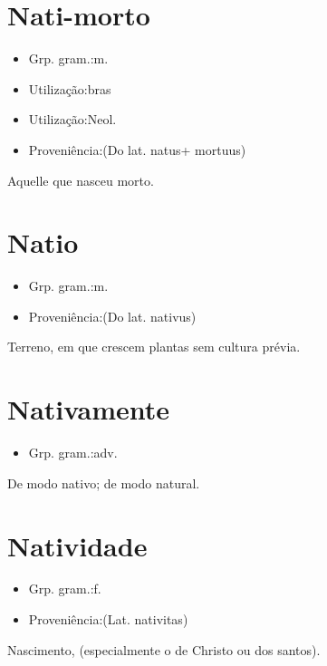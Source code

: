 \section{Nati-morto}
\begin{itemize}
\item {Grp. gram.:m.}
\end{itemize}
\begin{itemize}
\item {Utilização:bras}
\end{itemize}
\begin{itemize}
\item {Utilização:Neol.}
\end{itemize}
\begin{itemize}
\item {Proveniência:(Do lat. \textunderscore natus\textunderscore  + \textunderscore mortuus\textunderscore )}
\end{itemize}
Aquelle que nasceu morto.
\section{Natio}
\begin{itemize}
\item {Grp. gram.:m.}
\end{itemize}
\begin{itemize}
\item {Proveniência:(Do lat. \textunderscore nativus\textunderscore )}
\end{itemize}
Terreno, em que crescem plantas sem cultura prévia.
\section{Nativamente}
\begin{itemize}
\item {Grp. gram.:adv.}
\end{itemize}
De modo nativo; de modo natural.
\section{Natividade}
\begin{itemize}
\item {Grp. gram.:f.}
\end{itemize}
\begin{itemize}
\item {Proveniência:(Lat. \textunderscore nativitas\textunderscore )}
\end{itemize}
Nascimento, (especialmente o de Christo ou dos santos).
